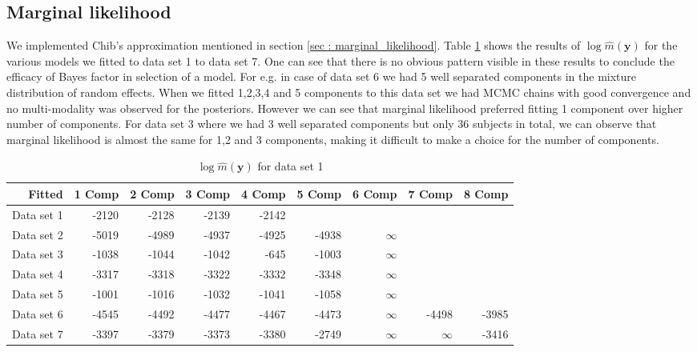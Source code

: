 \subsection{Marginal likelihood}
\label{subsec : marginal_likelihood_simulation}
We implemented Chib's approximation mentioned in section \ref{sec : marginal_likelihood}. Table \ref{table : marginal_likelihood_results} shows the results of $\log{\hat{m}(\boldsymbol{y})}$ for the various models we fitted to data set 1 to data set 7. One can see that there is no obvious pattern visible in these results to conclude the efficacy of Bayes factor in selection of a model. For e.g. in case of data set 6 we had 5 well separated components in the mixture distribution of random effects. When we fitted 1,2,3,4 and 5 components to this data set we had MCMC chains with good convergence and no multi-modality was observed for the posteriors. However we can see that marginal likelihood preferred fitting 1 component over higher number of components. For data set 3 where we had 3 well separated components but only 36 subjects in total, we can observe that marginal likelihood is almost the same for 1,2 and 3 components, making it difficult to make a choice for the number of components.

\begin{table}[!htb]
\centering
\caption{$\log{\hat{m}(\boldsymbol{y})}$ for data set 1}
\label{table : marginal_likelihood_results} 
\begin{tabular}{rrrrrrrrr}
\toprule
Fitted & 1 Comp & 2 Comp & 3 Comp & 4 Comp & 5 Comp & 6 Comp & 7 Comp & 8 Comp \\\midrule
Data set 1 & -2120 & -2128 & -2139 & -2142 &  &  &  &  \\
Data set 2 & -5019 & -4989 & -4937 & -4925 & -4938 & $\infty$ &  &  \\
Data set 3 & -1038 & -1044 & -1042 & -645 & -1003 & $\infty$ &  &  \\
Data set 4 & -3317 & -3318 & -3322 & -3332 & -3348 & $\infty$ &  &  \\
Data set 5 & -1001 & -1016 & -1032 & -1041 & -1058 & $\infty$ &  &  \\
Data set 6 & -4545 & -4492 & -4477 & -4467 & -4473 & $\infty$ & -4498 & -3985 \\
Data set 7 & -3397 & -3379 & -3373 & -3380 & -2749 & $\infty$ & $\infty$ & -3416 \\ \bottomrule
\end{tabular}
\end{table}

